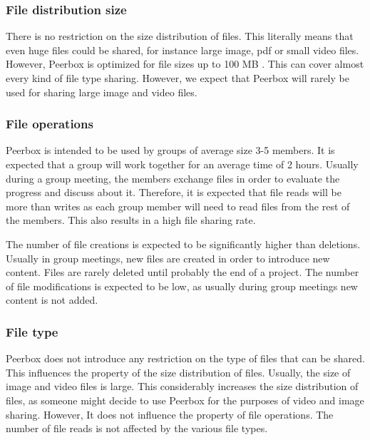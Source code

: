 \subsubsection{File distribution size}

There is no restriction on the size distribution of files. This literally means that even huge files could be shared, for instance large image, pdf or small video files. However, Peerbox is optimized for file sizes up to 100 MB . This can cover almost every kind of file type sharing. However, we expect that Peerbox will rarely be used for sharing large image and video files.

\subsubsection{File operations}

Peerbox is intended to be used by groups of average size 3-5 members. It is expected that a group will work together for an average time of 2 hours. Usually during a group meeting, the members exchange files in order to evaluate the progress and discuss about it. Therefore, it is expected that file reads will be more than writes as each group member will need to read files from the rest of the members. This also results in a high file sharing rate.

The number of file creations is expected to be significantly higher than deletions. Usually in group meetings, new files are created in order to introduce new content. Files are rarely deleted until probably the end of a project. The number of file modifications is expected to be low, as usually during group meetings new content is not added.

\subsubsection{File type}

Peerbox does not introduce any restriction on the type of files that can be shared. This influences the property of the size distribution of files. Usually, the size of image and video files is large. This considerably increases the size distribution of files, as someone might decide to use Peerbox for the purposes of video and image sharing. However, It does not influence the property of file operations. The number of file reads is not affected by the various file types.